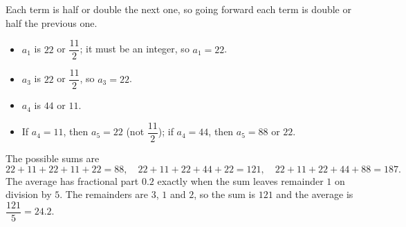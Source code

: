 Each term is half or double the next one, so going forward each term is double or half the previous one.
\begin{itemize}
\item $a_1$ is $22$ or $\dfrac{11}{2}$; it must be an integer, so $a_1=22$.
\item $a_3$ is $22$ or $\dfrac{11}{2}$, so $a_3=22$.
\item $a_4$ is $44$ or $11$.
\item If $a_4=11$, then $a_5=22$ (not $\dfrac{11}{2}$); if $a_4=44$, then $a_5=88$ or $22$.
\end{itemize}
The possible sums are
\[22+11+22+11+22=88,\quad22+11+22+44+22=121,\quad22+11+22+44+88=187.\]
The average has fractional part $0.2$ exactly when the sum leaves remainder $1$ on division by $5$. The remainders are $3$, $1$ and $2$, so the sum is $121$ and the average is $\dfrac{121}{5}=\boxed{24.2}$.
